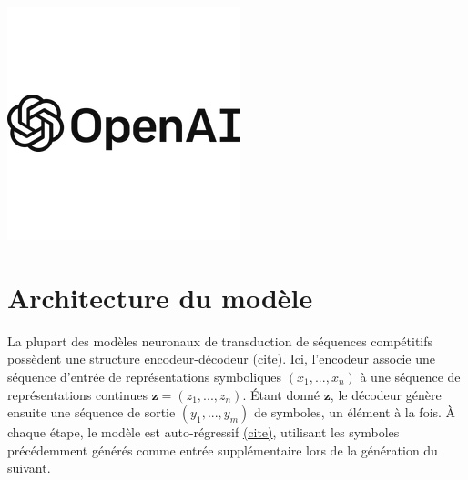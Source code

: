 \documentclass[
  letterpaper,
  DIV=11,
  numbers=noendperiod]{scrreprt}
\begin{document}
\includegraphics{images/6138535.webp}


\chapter{Architecture du modèle}\label{architecture-du-moduxe8le}

La plupart des modèles neuronaux de transduction de séquences
compétitifs possèdent une structure encodeur-décodeur
\href{https://arxiv.org/abs/1409.0473}{(cite)}. Ici, l'encodeur associe
une séquence d'entrée de représentations symboliques \((x_1, ..., x_n)\)
à une séquence de représentations continues
\(\mathbf{z} = (z_1, ..., z_n)\). Étant donné \(\mathbf{z}\), le
décodeur génère ensuite une séquence de sortie \((y_1,...,y_m)\) de
symboles, un élément à la fois. À chaque étape, le modèle est
auto-régressif \href{https://arxiv.org/abs/1308.0850}{(cite)}, utilisant
les symboles précédemment générés comme entrée supplémentaire lors de la
génération du suivant.
\end{document}
